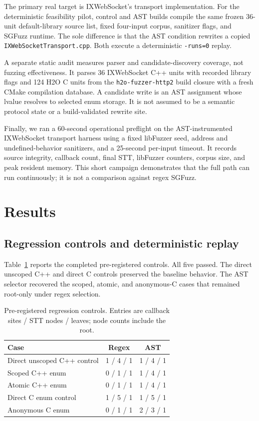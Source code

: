 \documentclass[conference]{IEEEtran}
\begin{document}
The primary real target is IXWebSocket's transport implementation. For the
deterministic feasibility pilot, control and AST builds compile the same frozen
36-unit default-library source list, fixed four-input corpus, sanitizer flags,
and SGFuzz runtime. The sole difference is that the AST condition rewrites a
copied \texttt{IXWebSocketTransport.cpp}. Both execute a deterministic
\texttt{-runs=0} replay.

A separate static audit measures parser and candidate-discovery coverage, not
fuzzing effectiveness. It parses 36 IXWebSocket C++ units with recorded
library flags and 124 H2O C units from the \texttt{h2o-fuzzer-http2} build
closure with a fresh CMake compilation database. A candidate write is an AST
assignment whose lvalue resolves to selected enum storage. It is not assumed to
be a semantic protocol state or a build-validated rewrite site.

Finally, we ran a 60-second operational preflight on the AST-instrumented
IXWebSocket transport harness using a fixed libFuzzer seed, address and
undefined-behavior sanitizers, and a 25-second per-input timeout. It records
source integrity, callback count, final STT, libFuzzer counters, corpus size,
and peak resident memory. This short campaign demonstrates that the full path
can run continuously; it is not a comparison against regex SGFuzz.

\section{Results}

\subsection{Regression controls and deterministic replay}

Table~\ref{tab:controls} reports the completed pre-registered controls. All
five passed. The direct unscoped C++ and direct C controls preserved the
baseline behavior. The AST selector recovered the scoped, atomic, and
anonymous-C cases that remained root-only under regex selection.

\begin{table}[t]
\centering
\caption{Pre-registered regression controls. Entries are callback sites / STT
nodes / leaves; node counts include the root.}
\label{tab:controls}
\footnotesize
\setlength{\tabcolsep}{2.6pt}
\begin{tabular}{@{}p{}cc@{}}
\toprule
\textbf{Case} & \textbf{Regex} & \textbf{AST} \\
\midrule
Direct unscoped C++ control & 1 / 4 / 1 & 1 / 4 / 1 \\
Scoped C++ enum & 0 / 1 / 1 & 1 / 4 / 1 \\
Atomic C++ enum & 0 / 1 / 1 & 1 / 4 / 1 \\
Direct C enum control & 1 / 5 / 1 & 1 / 5 / 1 \\
Anonymous C enum & 0 / 1 / 1 & 2 / 3 / 1 \\
\bottomrule
\end{tabular}
\end{table}
\end{document}
